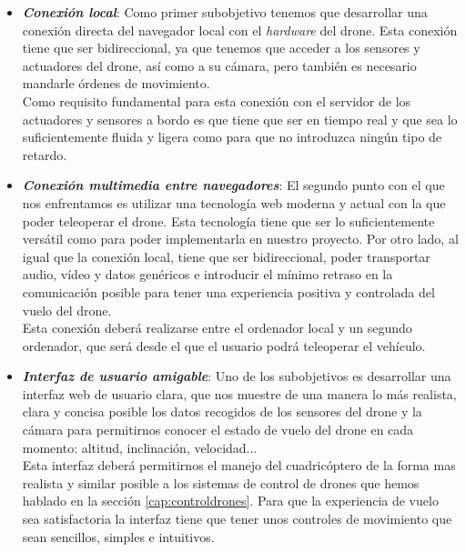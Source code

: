 \begin{itemize}


\item \emph{\textbf{Conexión local}}: Como primer subobjetivo tenemos que desarrollar una conexión directa del navegador local con el \emph{hardware} del drone. Esta conexión tiene que ser bidireccional, ya que tenemos que acceder a los sensores y actuadores del drone, así como a su cámara, pero también es necesario mandarle órdenes de movimiento.\\

Como requisito fundamental para esta conexión con el servidor de los actuadores y sensores a bordo es que tiene que ser en tiempo real y que sea lo suficientemente fluida y ligera como para que no introduzca ningún tipo de retardo.\\


\item \emph{\textbf{Conexión multimedia entre navegadores}}: El segundo punto con el que nos enfrentamos es utilizar una tecnología web moderna y actual con la que poder teleoperar el drone. Esta tecnología tiene que ser lo suficientemente versátil como para poder implementarla en nuestro proyecto. Por otro lado, al igual que la conexión local, tiene que ser bidireccional, poder transportar audio, vídeo y datos genéricos e introducir el mínimo retraso en la comunicación posible para tener una experiencia positiva y controlada del vuelo del drone.\\

Esta conexión deberá realizarse entre el ordenador local y un segundo ordenador, que será desde el que el usuario podrá teleoperar el vehículo.\\


\item \emph{\textbf{Interfaz de usuario amigable}}: Uno de los subobjetivos es desarrollar una interfaz web de usuario clara, que nos muestre de una manera lo más realista, clara y concisa posible los datos recogidos de los sensores del drone y la cámara para permitirnos conocer el estado de vuelo del drone en cada momento: altitud, inclinación, velocidad...\\

Esta interfaz deberá permitirnos el manejo del cuadricóptero de la forma mas realista y similar posible a los sistemas de control de drones que hemos hablado en la sección \ref{cap:controldrones}. Para que la experiencia de vuelo sea satisfactoria la interfaz tiene que tener unos controles de movimiento que sean sencillos, simples e intuitivos.\\

\end{itemize}



